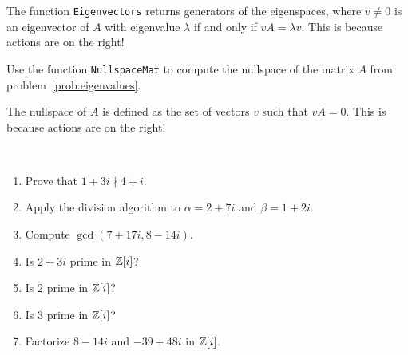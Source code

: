 The function \lstinline{Eigenvectors} returns generators of the eigenspaces,
where $v\ne0$ is an eigenvector of $A$ with eigenvalue $\lambda$ if and only
if $vA=\lambda v$. This is because actions are on the right! 

\begin{prob}
  Use the function \lstinline{NullspaceMat} to compute the nullspace 
  of the matrix $A$ from problem~\ref{prob:eigenvalues}. 
\end{prob}

The nullspace of $A$ is defined as the set of vectors $v$ such that $vA=0$. This is because actions are on the right! 

\begin{prob}\
    \begin{enumerate}
        \item Prove that $1+3i\nmid 4+i$.
        \item Apply the division algorithm to $\alpha=2+7i$ and $\beta=1+2i$.
        \item Compute $\gcd(7+17i,8-14i)$.
        \item Is $2+3i$ prime in $\mathbb{Z}[i]$?
        \item Is $2$ prime in $\mathbb{Z}[i]$? 
        \item Is $3$ prime in $\mathbb{Z}[i]$? 
        \item Factorize $8-14i$ and $-39+48i$ in $\mathbb{Z}[i]$.
    \end{enumerate}
\end{prob}

